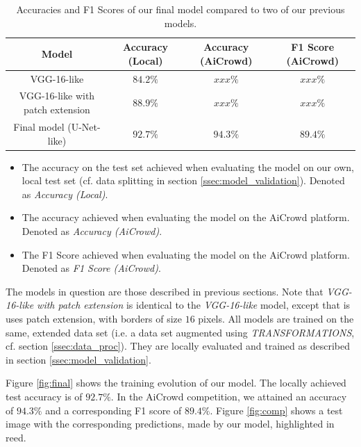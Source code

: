 \documentclass[10pt,conference,compsocconf]{IEEEtran}
\begin{document}
\begin{table}[h]
	\centering
	\begin{tabular}{ |c|c|c|c| } 
		\hline
		\textbf{Model} & \textbf{Accuracy (Local)} & \textbf{Accuracy (AiCrowd)} & \textbf{F1 Score (AiCrowd)} \\
		\hline
		VGG-16-like & $84.2\%$ & $xxx\%$ & $xxx\%$ \\ 
		VGG-16-like with patch extension & $88.9\%$ & $xxx\%$ & $xxx\%$\\ 
		Final model (U-Net-like) & $92.7\%$ & $94.3\%$ & $89.4\%$ \\ 
		\hline
	\end{tabular}
	\captionsetup{aboveskip=0.3cm,justification=centering, margin=0.1cm, labelfont=footnotesize, textfont=footnotesize}
	\caption{Accuracies and F1 Scores of our final model compared to two of our previous models.}
	\label{tab:model_accuracy}
\end{table}

\begin{itemize}
	\item The accuracy on the test set achieved when evaluating the model on our own, local test set (cf. data splitting in section \ref{ssec:model_validation}). Denoted as \textit{Accuracy (Local)}.
	\item The accuracy achieved when evaluating the model on the AiCrowd platform. Denoted as \textit{Accuracy (AiCrowd)}.
	\item The F1 Score achieved when evaluating the model on the AiCrowd platform. Denoted as \textit{F1 Score (AiCrowd)}.
\end{itemize}
The models in question are those described in previous sections. Note that \textit{VGG-16-like with patch extension} is identical to the \textit{VGG-16-like} model, except that is uses patch extension, with borders of size $16$ pixels. All models are trained on the same, extended data set (i.e. a data set augmented using \textit{TRANSFORMATIONS}, cf. section \ref{ssec:data_proc}). They are locally evaluated and trained as described in section \ref{ssec:model_validation}.

Figure \ref{fig:final} shows the training evolution of our model. The locally achieved test accuracy is of $92.7\%$. In the AiCrowd competition, we attained an accuracy of $94.3\%$ and a corresponding F1 score of $89.4\%$. Figure \ref{fig:comp} shows a test image with the corresponding predictions, made by our model, highlighted in reed.
\end{document}
